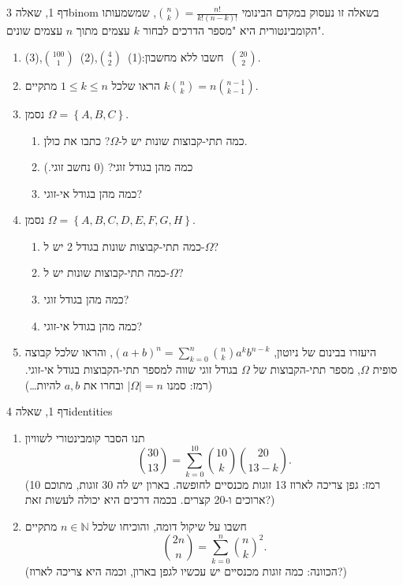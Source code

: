 \documentclass[11pt,a4paper]{report}
\newcommand{\N}{\mathbb{N}}
\newcommand{\set}[1]{\left\{#1\right\}}
\begin{document}
\begin{exercise}{דף 1, שאלה 3}{binom}
בשאלה זו נעסוק במקדם הבינומי $\binom nk=\frac{n!}{k!(n-k)!}$, שמשמעותו הקומבינטורית היא "מספר הדרכים לבחור $k$ עצמים מתוך $n$ עצמים שונים".
\begin{enumerate}[label=(\alph*)]
  \item חשבו ללא מחשבון:\quad (1)~$\binom42$,\qquad (2)~$\binom{100}1$,\qquad (3)~$\binom{20}2$.
  \item הראו שלכל $1\le k\le n$ מתקיים $k\binom nk=n\binom{n-1}{k-1}$.
  \item נסמן $\Omega=\set{A,B,C}$.
  \begin{enumerate}[label=(\arabic*)]
    \item כמה תתי-קבוצות שונות יש ל-$\Omega$? כתבו את כולן.
    \item כמה מהן בגודל זוגי? ($0$ נחשב זוגי.)
    \item כמה מהן בגודל אי-זוגי?
  \end{enumerate}
  \item נסמן $\Omega=\set{A,B,C,D,E,F,G,H}$.
  \begin{enumerate}[label=(\arabic*)]
    \item כמה תתי-קבוצות שונות בגודל 2 יש ל-$\Omega$?
    \item כמה תתי-קבוצות שונות יש ל-$\Omega$?
    \item כמה מהן בגודל זוגי?
    \item כמה מהן בגודל אי-זוגי?
  \end{enumerate}
  \item היעזרו בבינום של ניוטון, $(a+b)^n=\sum_{k=0}^n\binom nka^kb^{n-k}$, והראו שלכל קבוצה סופית $\Omega$, מספר תתי-הקבוצות של $\Omega$ בגודל זוגי שווה למספר תתי-הקבוצות בגודל אי-זוגי. (רמז: סמנו $|\Omega|=n$ ובחרו את $a,b$ להיות\dots)
\end{enumerate}
\end{exercise}

\begin{exercise}{דף 1, שאלה 4}{identities}
\begin{enumerate}[label=(\alph*)]
  \item תנו הסבר קומבינטורי לשוויון
  \[
    \binom{30}{13}=\sum_{k=0}^{10}\binom{10}k\binom{20}{13-k}.
  \]
  (רמז: גפן צריכה לארוז 13 זוגות מכנסיים לחופשה. בארון יש לה 30 זוגות, מתוכם 10 ארוכים ו-20 קצרים. בכמה דרכים היא יכולה לעשות זאת?)
  \item חשבו על שיקול דומה, והוכיחו שלכל $n\in\N$ מתקיים
  \[
    \binom{2n}n=\sum_{k=0}^n\binom nk^2.
  \]
  (הכוונה: כמה זוגות מכנסיים יש עכשיו לגפן בארון, וכמה היא צריכה לארוז?)
\end{enumerate}
\end{exercise}
\end{document}
